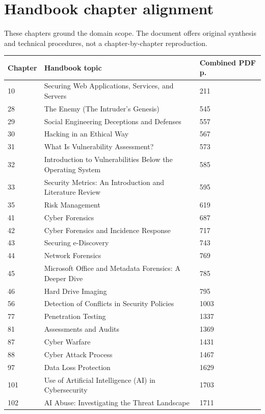 \documentclass[10pt,letterpaper,oneside]{article}
\begin{document}
\section*{Handbook chapter alignment}
These chapters ground the domain scope. The document offers original synthesis and technical procedures, not a chapter-by-chapter reproduction.
\par\medskip\noindent\begin{longtable}{@{}p{}p{}p{}@{}}\toprule Chapter & Handbook topic & Combined PDF p. \\ \midrule\endhead10 & Securing Web Applications, Services, and Servers & 211 \\
28 & The Enemy (The Intruder's Genesis) & 545 \\
29 & Social Engineering Deceptions and Defenses & 557 \\
30 & Hacking in an Ethical Way & 567 \\
31 & What Is Vulnerability Assessment? & 573 \\
32 & Introduction to Vulnerabilities Below the Operating System & 585 \\
33 & Security Metrics: An Introduction and Literature Review & 595 \\
35 & Risk Management & 619 \\
41 & Cyber Forensics & 687 \\
42 & Cyber Forensics and Incidence Response & 717 \\
43 & Securing e-Discovery & 743 \\
44 & Network Forensics & 769 \\
45 & Microsoft Office and Metadata Forensics: A Deeper Dive & 785 \\
46 & Hard Drive Imaging & 795 \\
56 & Detection of Conflicts in Security Policies & 1003 \\
77 & Penetration Testing & 1337 \\
81 & Assessments and Audits & 1369 \\
87 & Cyber Warfare & 1431 \\
88 & Cyber Attack Process & 1467 \\
97 & Data Loss Protection & 1629 \\
101 & Use of Artificial Intelligence (AI) in Cybersecurity & 1703 \\
102 & AI Abuse: Investigating the Threat Landscape & 1711 \\
\bottomrule\end{longtable}\par\medskip
\end{document}
